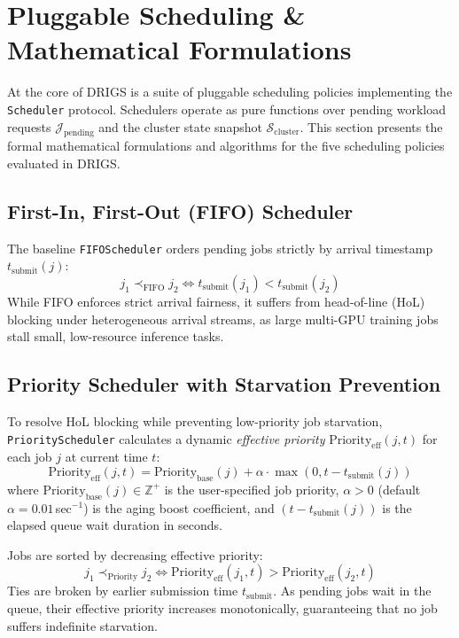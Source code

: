 \section{Pluggable Scheduling \& Mathematical Formulations}
\label{sec:scheduling}

At the core of DRIGS is a suite of pluggable scheduling policies implementing the \texttt{Scheduler} protocol. Schedulers operate as pure functions over pending workload requests $\mathcal{J}_{\text{pending}}$ and the cluster state snapshot $\mathcal{S}_{\text{cluster}}$. This section presents the formal mathematical formulations and algorithms for the five scheduling policies evaluated in DRIGS.

\subsection{First-In, First-Out (FIFO) Scheduler}
The baseline \texttt{FIFOScheduler} orders pending jobs strictly by arrival timestamp $t_{\text{submit}}(j)$:
\begin{equation}
    j_1 \prec_{\text{FIFO}} j_2 \iff t_{\text{submit}}(j_1) < t_{\text{submit}}(j_2)
\end{equation}
While FIFO enforces strict arrival fairness, it suffers from head-of-line (HoL) blocking under heterogeneous arrival streams, as large multi-GPU training jobs stall small, low-resource inference tasks.

\subsection{Priority Scheduler with Starvation Prevention}
To resolve HoL blocking while preventing low-priority job starvation, \texttt{PriorityScheduler} calculates a dynamic \emph{effective priority} $\text{Priority}_{\text{eff}}(j, t)$ for each job $j$ at current time $t$:
\begin{equation}
    \text{Priority}_{\text{eff}}(j, t) = \text{Priority}_{\text{base}}(j) + \alpha \cdot \max\left(0, t - t_{\text{submit}}(j)\right)
\end{equation}
where $\text{Priority}_{\text{base}}(j) \in \mathbb{Z}^+$ is the user-specified job priority, $\alpha > 0$ (default $\alpha = 0.01$\,sec$^{-1}$) is the aging boost coefficient, and $(t - t_{\text{submit}}(j))$ is the elapsed queue wait duration in seconds.

Jobs are sorted by decreasing effective priority:
\begin{equation}
    j_1 \prec_{\text{Priority}} j_2 \iff \text{Priority}_{\text{eff}}(j_1, t) > \text{Priority}_{\text{eff}}(j_2, t)
\end{equation}
Ties are broken by earlier submission time $t_{\text{submit}}$. As pending jobs wait in the queue, their effective priority increases monotonically, guaranteeing that no job suffers indefinite starvation.

